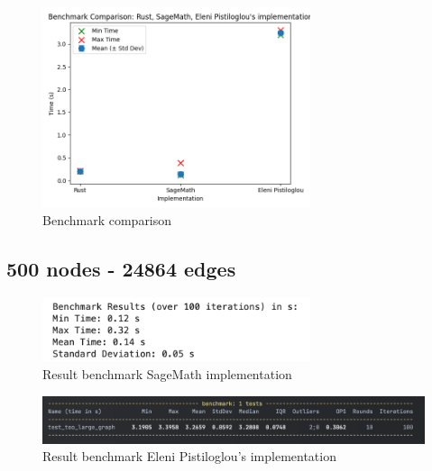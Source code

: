 \begin{figure}[!h]
    \centering
    \includegraphics[width=0.70\textwidth]{images/benchmark/too_large_graph/benchmark_comparison_graph_500_24876}
    \caption{Benchmark comparison}
    \label{fig:benchmark-comparison-graph-500-24876}
\end{figure}


\newpage


\subsection{500 nodes - 24864 edges}\label{subsec:result-for-graphs-500-24864}

\begin{figure}[!h]
    \centering
    \includegraphics[width=0.70\textwidth]{images/benchmark/graph_500_24864/benchmark_graph_500_24864_sagemath}
    \caption{Result benchmark SageMath implementation}
    \label{fig:benchmark-graph-500-24864-sagemath}
\end{figure}

\begin{figure}[!h]
    \centering
    \includegraphics[width=1\textwidth]{images/benchmark/graph_500_24864/benchmark_graph_500_24864_python}
    \caption{Result benchmark Eleni Pistiloglou's implementation}
    \label{fig:benchmark-graph-500-24864-python}
\end{figure}

